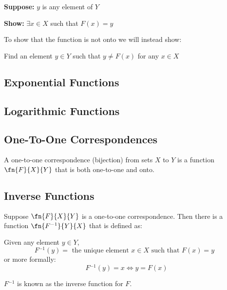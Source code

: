 \documentclass[11pt]{article}
\newcommand\inv{\ensuremath{^{-1}}}
\begin{document}
\begin{definition}\label{def:prove-onto}
    \textbf{Suppose:} $y$ is any element of $Y$

    \textbf{Show:} $\exists x \in X$ such that $F(x) = y$

    To show that the function is not onto we will instead show:

     Find an element $y \in Y$ such that $y \neq F(x)$ for any $x \in X$
\end{definition}

\subsection{Exponential Functions}
\subsection{Logarithmic Functions}

\subsection{One-To-One Correspondences}
\begin{definition}\label{def:one-to-one-correspondence}
    A one-to-one correspondence (bijection) from sets $X$ to $Y$ is a function $\fn{F}{X}{Y}$
    that is both one-to-one and onto.
\end{definition}

\subsection{Inverse Functions}

\begin{definition}\label{def:inverse-fn}
    Suppose $\fn{F}{X}{Y}$ is a one-to-one correspondence. Then there is a function $\fn{F\inv}{Y}{X}$ that is defined as:

    Given any element $y \in Y$,
    \begin{equation*}
        F\inv(y) = \text{ the unique element $x \in X$ such that $F(x) = y$ }
    \end{equation*}
    or more formally:
    \begin{equation*}
        F\inv(y) = x \iff y = F(x)
    \end{equation*}
    
    $F\inv$ is known as the inverse function for $F$.
\end{definition}
\end{document}
